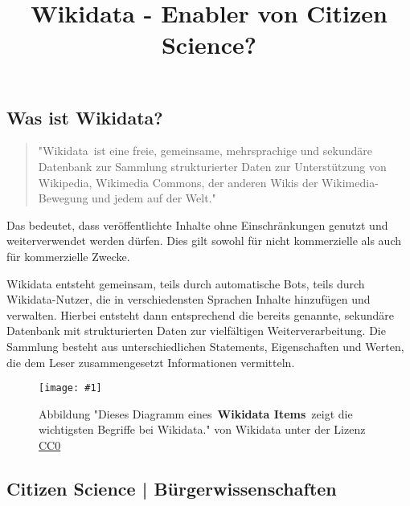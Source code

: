 \documentclass{article}
\newlength{\imgwidth}
\newcommand\scaledgraphics[2]{%
                
\settowidth{\imgwidth}{\texttt{[image: \#1]}}%
                
\setlength{\imgwidth}{\minof{\imgwidth}{#2\textwidth}}%
                
\texttt{[image: \#1]}%
                
}
\begin{document}
\title{Wikidata - Enabler von Citizen Science?}

\maketitle





\subsection{Was ist Wikidata?}\label{H170397}


\begin{quote}



"Wikidata ist eine freie, gemeinsame, mehrsprachige und sekundäre Datenbank zur Sammlung strukturierter Daten zur Unterstützung von Wikipedia, Wikimedia Commons, der anderen Wikis der Wikimedia-Bewegung und jedem auf der Welt." \autocite{Wikidata}


\end{quote}


Das bedeutet, dass veröffentlichte Inhalte ohne Einschränkungen genutzt und weiterverwendet werden dürfen. Dies gilt sowohl für nicht kommerzielle als auch für kommerzielle Zwecke.


Wikidata entsteht gemeinsam, teils durch automatische Bots, teils durch Wikidata-Nutzer, die in verschiedensten Sprachen Inhalte hinzufügen und verwalten. Hierbei entsteht dann entsprechend die bereits genannte, sekundäre Datenbank mit strukturierten Daten zur vielfältigen Weiterverarbeitung. Die Sammlung besteht aus unterschiedlichen Statements, Eigenschaften und Werten, die dem Leser zusammengesetzt Informationen vermitteln. 

\begin{figure}
\scaledgraphics{229df610-16c7-48d4-b502-ee9bc3b58968.png}{0.75}
\caption*{Abbildung "Dieses Diagramm eines \textbf{Wikidata Items} zeigt die wichtigsten Begriffe bei Wikidata." von Wikidata unter der Lizenz \href{https://creativecommons.org/publicdomain/zero/1.0/deed.de}{CC0}}\label{F79312931}
\end{figure}





\subsection{Citizen Science | Bürgerwissenschaften}\label{H3895833}
\end{document}
